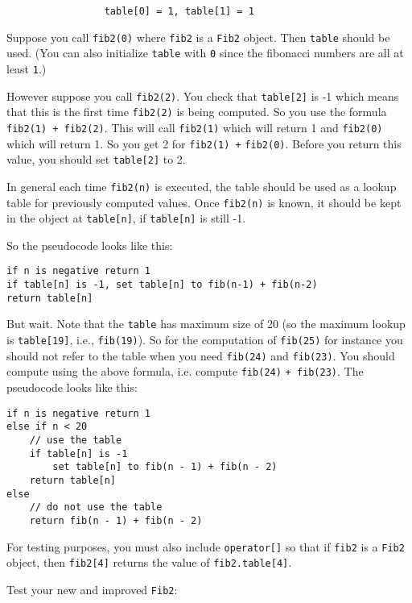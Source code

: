\verb!                 table[0] = 1, table[1] = 1!

Suppose you call \verb!fib2(0)! where \verb!fib2! is a \texttt{Fib2} object.
Then \verb!table! should be used.
(You can also initialize \verb!table! with \verb!0! since the
fibonacci numbers are all at least \verb!1!.)

However suppose you call \verb!fib2(2)!. You check that \verb!table[2]! is -1 which means that this is the
first time \verb!fib2(2)! is being computed. So you use the formula \verb!fib2(1) + fib2(2)!. This will call
\verb!fib2(1)! which will return 1 and \verb!fib2(0)! which will return 1. So you get 2 for \verb!fib2(1) +!
\verb!fib2(0)!. Before you return this value, you should set \verb!table[2]! to 2.

In general each time \verb!fib2(n)! is executed, the table should be used as a lookup table for previously
computed values. Once \verb!fib2(n)! is known, it should be kept in the object at \verb!table[n]!, if \verb!table[n]!
is still -1.

So the pseudocode looks like this:

\begin{Verbatim}[frame=single]
if n is negative return 1
if table[n] is -1, set table[n] to fib(n-1) + fib(n-2)
return table[n]
\end{Verbatim}

But wait. Note that the \verb!table!
has maximum size of 20 (so the maximum lookup is \verb!table[19]!, i.e.,
\verb!fib(19)!). So for the computation of \verb!fib(25)! for instance you should not refer to the table when you
need \verb!fib(24)! and \verb!fib(23)!. You should compute using the above formula, i.e. compute \verb!fib(24)!
\verb!+ fib(23)!. The pseudocode looks like this:

\begin{Verbatim}[frame=single]
if n is negative return 1
else if n < 20
    // use the table
    if table[n] is -1
        set table[n] to fib(n - 1) + fib(n - 2)
    return table[n]
else
    // do not use the table
    return fib(n - 1) + fib(n - 2)
\end{Verbatim}

For testing purposes, you must also include \texttt{operator[]} so that if \verb!fib2! is a \texttt{Fib2} object, then \verb!fib2[4]!
returns the value of \verb!fib2.table[4]!.

Test your new and improved \texttt{Fib2}:

